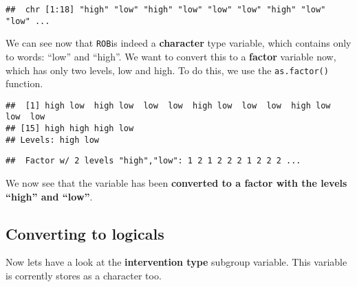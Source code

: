 \documentclass[]{book}
\newenvironment{Shaded}{\begin{snugshade}}{\end{snugshade}}
\newcommand{\KeywordTok}[1]{\textcolor[rgb]{0.13,0.29,0.53}{\textbf{#1}}}
\newcommand{\OperatorTok}[1]{\textcolor[rgb]{0.81,0.36,0.00}{\textbf{#1}}}
\newcommand{\NormalTok}[1]{#1}
\theoremstyle{definition}
\theoremstyle{definition}
\theoremstyle{definition}
\theoremstyle{remark}
\begin{document}
\begin{Shaded}
\end{Shaded}

\begin{verbatim}
##  chr [1:18] "high" "low" "high" "low" "low" "low" "high" "low" "low" ...
\end{verbatim}

We can see now that \texttt{ROB}is indeed a \textbf{character} type
variable, which contains only to words: ``low'' and ``high''. We want to
convert this to a \textbf{factor} variable now, which has only two
levels, low and high. To do this, we use the \texttt{as.factor()}
function.

\begin{Shaded}
\end{Shaded}

\begin{verbatim}
##  [1] high low  high low  low  low  high low  low  low  high low  low  low 
## [15] high high high low 
## Levels: high low
\end{verbatim}

\begin{Shaded}
\end{Shaded}

\begin{verbatim}
##  Factor w/ 2 levels "high","low": 1 2 1 2 2 2 1 2 2 2 ...
\end{verbatim}

We now see that the variable has been \textbf{converted to a factor with
the levels ``high'' and ``low''}.

\subsection{Converting to logicals}\label{converting-to-logicals}

Now lets have a look at the \textbf{intervention type} subgroup
variable. This variable is corrently stores as a character too.
\end{document}
